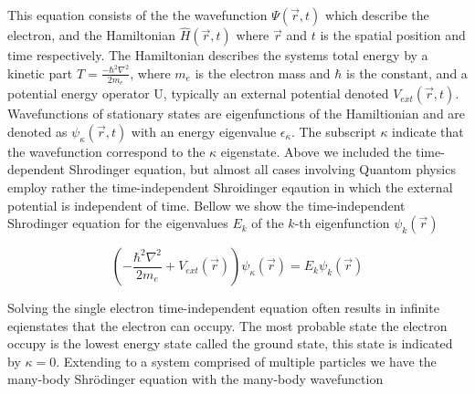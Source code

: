 This equation consists of the the wavefunction $\Psi(\vec{r},t)$ which describe the electron, and the Hamiltonian $\hat{H}(\vec{r},t)$ where $\vec{r}$ and $t$ is the spatial position and time respectively. The Hamiltonian describes the systems total energy by a kinetic part $T = \frac{-\hbar^2\nabla^2}{2m_e}$, where $m_e$ is the electron mass and $\hbar$ is the constant, and a potential energy operator U, typically an external potential denoted $V_{ext}(\vec{r}, t)$. Wavefunctions of stationary states are eigenfunctions of the Hamiltionian and are denoted as $\psi_{\kappa}(\vec{r}, t)$ with an energy eigenvalue $\epsilon_{\kappa}$. The subscript $\kappa$ indicate that the wavefunction correspond to the $\kappa$ eigenstate. Above we included the time-dependent Shrodinger equation, but almost all cases involving Quantom physics employ rather the time-independent Shroidinger eqaution in which the external potential is independent of time. Bellow we show the time-independent Shrodinger equation for the eigenvalues $E_k$ of the $k$-th eigenfunction $\psi_k(\vec{r})$

\begin{equation}
	\left(-\frac{\hbar^2\nabla^2}{2m_e} + V_{ext}(\vec{r}) \right)\psi_{\kappa}(\vec{r}) = E_k \psi_k(\vec{r})
\end{equation}

Solving the single electron time-independent equation often results in infinite eqienstates that the electron can occupy. The most probable state the electron occupy is the lowest energy state called the ground state, this state is indicated by $\kappa = 0$. Extending to a system comprised of multiple particles we have the many-body Shr\"{o}dinger equation with the many-body wavefunction 

